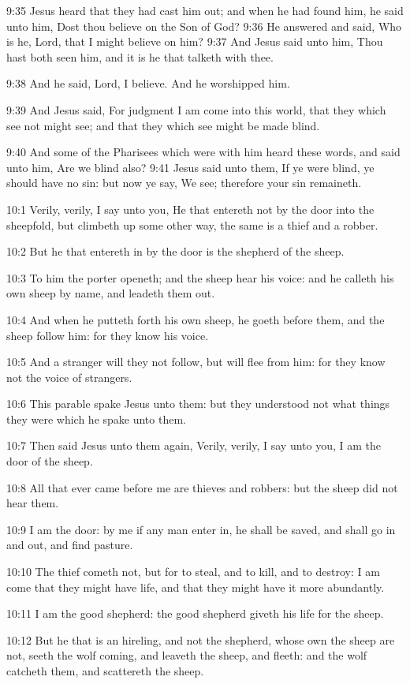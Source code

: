 9:35 Jesus heard that they had cast him out; and when he had found
him, he said unto him, Dost thou believe on the Son of God?  9:36 He
answered and said, Who is he, Lord, that I might believe on him?  9:37
And Jesus said unto him, Thou hast both seen him, and it is he that
talketh with thee.

9:38 And he said, Lord, I believe. And he worshipped him.

9:39 And Jesus said, For judgment I am come into this world, that they
which see not might see; and that they which see might be made blind.

9:40 And some of the Pharisees which were with him heard these words,
and said unto him, Are we blind also?  9:41 Jesus said unto them, If
ye were blind, ye should have no sin: but now ye say, We see;
therefore your sin remaineth.

10:1 Verily, verily, I say unto you, He that entereth not by the door
into the sheepfold, but climbeth up some other way, the same is a
thief and a robber.

10:2 But he that entereth in by the door is the shepherd of the sheep.

10:3 To him the porter openeth; and the sheep hear his voice: and he
calleth his own sheep by name, and leadeth them out.

10:4 And when he putteth forth his own sheep, he goeth before them,
and the sheep follow him: for they know his voice.

10:5 And a stranger will they not follow, but will flee from him: for
they know not the voice of strangers.

10:6 This parable spake Jesus unto them: but they understood not what
things they were which he spake unto them.

10:7 Then said Jesus unto them again, Verily, verily, I say unto you,
I am the door of the sheep.

10:8 All that ever came before me are thieves and robbers: but the
sheep did not hear them.

10:9 I am the door: by me if any man enter in, he shall be saved, and
shall go in and out, and find pasture.

10:10 The thief cometh not, but for to steal, and to kill, and to
destroy: I am come that they might have life, and that they might have
it more abundantly.

10:11 I am the good shepherd: the good shepherd giveth his life for
the sheep.

10:12 But he that is an hireling, and not the shepherd, whose own the
sheep are not, seeth the wolf coming, and leaveth the sheep, and
fleeth: and the wolf catcheth them, and scattereth the sheep.

